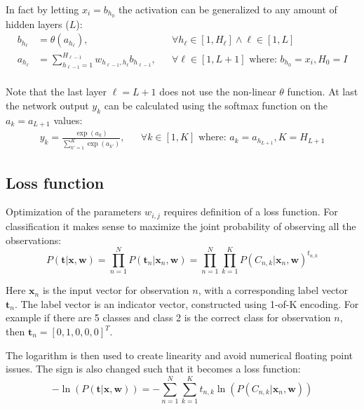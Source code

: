 In fact by letting $x_i = b_{h_0}$ the activation can be generalized to any amount of hidden layers ($L$):
\begin{equation}
\begin{aligned}
b_{h_\ell} &= \theta(a_{h_\ell}), && \forall h_{\ell} \in [1, H_{\ell}] \wedge \ell \in [1, L] \\
a_{h_\ell} &= \sum_{h_{\ell-1} = 1}^{H_{\ell-1}} w_{h_{\ell-1}, h_{\ell}} b_{h_{\ell-1}}, && \forall \ell \in [1, L+1] \text{ where: } b_{h_0} = x_i, H_0 = I \\
\end{aligned}
\end{equation}

Note that the last layer $\ell = L + 1$ does not use the non-linear $\theta$ function. 
At last the network output $y_k$ can be calculated using the softmax function on the $a_k = a_{L+1}$ values:
\begin{equation}
\begin{aligned}
y_k = \frac{\exp(a_k)}{\sum_{k'=1}^K \exp(a_{k'})}, && \forall k \in [1, K] \text{ where: } a_k=a_{h_{L+1}}, K = H_{L + 1}
\end{aligned}
\label{eq:theory:ffnn:y}
\end{equation}

\subsection{Loss function}

Optimization of the parameters $w_{i,j}$ requires definition of a loss function. For classification it makes sense to maximize the joint probability of observing all the observations:
\begin{equation}
P(\mathbf{t} | \mathbf{x}, \mathbf{w}) = \prod_{n=1}^N P(\mathbf{t}_n | \mathbf{x}_n, \mathbf{w})  = \prod_{n=1}^N \prod_{k=1}^K P(C_{n, k} | \mathbf{x}_n, \mathbf{w})^{t_{n, k}}
\end{equation}

Here $\mathbf{x}_{n}$ is the input vector for observation $n$, with a corresponding label vector $\mathbf{t}_n$. The label vector is an indicator vector, constructed using 1-of-K encoding. For example if there are 5 classes and class 2 is the correct class for observation $n$, then $\mathbf{t}_n = [0, 1, 0, 0, 0]^T$.

The logarithm is then used to create linearity and avoid numerical floating point issues. The sign is also changed such that it becomes a loss function:
\begin{equation}
- \ln\left(P(\mathbf{t} | \mathbf{x}, \mathbf{w})\right) = - \sum_{n=1}^N \sum_{k=1}^K t_{n, k} \ln\left( P(C_{n, k} | \mathbf{x}_n, \mathbf{w})\right)
\end{equation}

